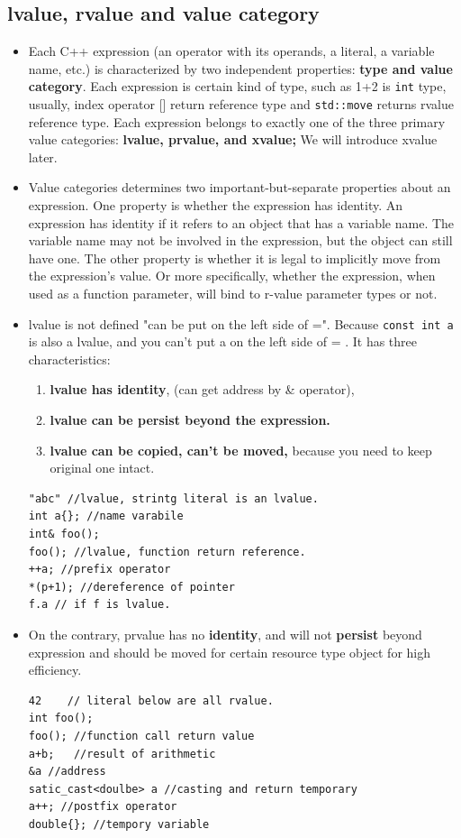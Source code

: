 \documentclass[a4paper,11pt,twoside]{book}
\begin{document}
\subsection{lvalue, rvalue and value category}
\begin{itemize}

	\item Each C++ expression (an operator with its operands, a literal, a variable name, etc.) is characterized by two independent properties: \textbf{type and value category}. Each expression is certain kind of type, such as 1+2 is \texttt{int} type, usually, index operator [] return reference type and \texttt{std::move} returns rvalue reference type. Each expression belongs to exactly one of the three primary value categories: \textbf{lvalue, prvalue, and xvalue;} We will introduce xvalue later. 
			
    \item Value categories determines two important-but-separate properties about an expression. One property is whether the expression has identity. An expression has identity if it refers to an object that has a variable name. The variable name may not be involved in the expression, but the object can still have one. The other property is whether it is legal to implicitly move from the expression's value. Or more specifically, whether the expression, when used as a function parameter, will bind to r-value parameter types or not.

	\item lvalue is not defined "can be put on the left side of =". Because \texttt{const int a} is also a lvalue, and you can't put a on the left side of = . It has three characteristics:
\begin{enumerate}
	\item\textbf{lvalue has identity}, (can get address by \& operator),
	\item \textbf{lvalue can be persist beyond the expression. }
	\item \textbf{lvalue can be copied, can't be moved,} because you need to keep original one intact.
\end{enumerate}
\begin{lstlisting}
"abc" //lvalue, strintg literal is an lvalue.
int a{}; //name varabile 
int& foo();
foo(); //lvalue, function return reference.
++a; //prefix operator
*(p+1); //dereference of pointer
f.a // if f is lvalue.	
\end{lstlisting}

	\item On the contrary, prvalue has no \textbf{identity}, and will not \textbf{persist} beyond expression and should be moved for certain resource type object for high efficiency.
\begin{lstlisting}
42    // literal below are all rvalue.
int foo();  
foo(); //function call return value
a+b;   //result of arithmetic
&a //address 
satic_cast<doulbe> a //casting and return temporary
a++; //postfix operator
double{}; //tempory variable	
\end{lstlisting}


\end{itemize}
\end{document}
